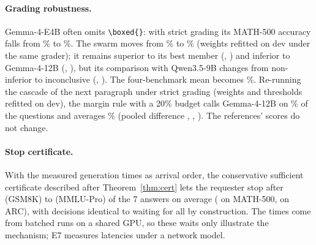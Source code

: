 \documentclass[11pt]{article}
\theoremstyle{definition}
\theoremstyle{remark}
\begin{document}
\paragraph{Grading robustness.} Gemma-4-E4B often omits \texttt{\textbackslash boxed\{\}}: with strict
grading its MATH-500 accuracy falls from \eFourMathGemmaEFour\% to \eFourStrictMathGemmaEFour\%. The
swarm moves from \eFourMathSwarm\% to \eFourStrictMathSwarm\% (weights refitted on dev under the same
grader); it remains superior to its best member (\eFourStrictMathBestDiff, \eFourStrictMathBestCI) and
inferior to Gemma-4-12B (\eFourStrictMathGemmaTwelveDiff, \eFourStrictMathGemmaTwelveCI), but its
comparison with Qwen3.5-9B changes from non-inferior to inconclusive (\eFourStrictMathQwenNineDiff,
\eFourStrictMathQwenNineCI). The four-benchmark mean becomes \eFourStrictMeanSwarm\%. Re-running the cascade
of the next paragraph under strict grading (weights and thresholds refitted on dev), the margin rule with a
20\% budget calls Gemma-4-12B on \eFourStrictCascGemmaTwelveMarTwentyCalls\% of the questions and averages
\eFourStrictCascGemmaTwelveMarTwentyAcc\% (pooled difference \eFourStrictCascGemmaTwelveMarTwentyDiff,
\eFourStrictCascGemmaTwelveMarTwentyCI, \eFourStrictCascGemmaTwelveMarTwentyVerdict). The references' scores do not
change.

\paragraph{Stop certificate.} With the measured generation times as arrival order, the conservative sufficient
certificate
described after Theorem~\ref{thm:cert} lets the requester stop after \eFourWaitsMin{} (GSM8K) to \eFourWaitsMax{}
(MMLU-Pro)
of the 7 answers on average (\eFourMathWaits{} on MATH-500, \eFourArcWaits{} on ARC), with decisions
identical to waiting for all by construction. The times come from batched runs on a shared GPU, so these
waits only illustrate the mechanism; E7 measures latencies under a network model.
\end{document}
